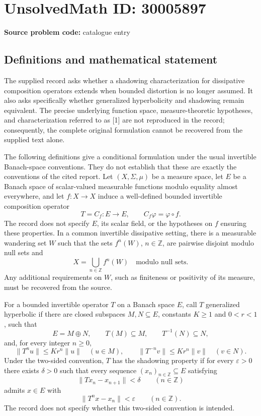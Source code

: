 \documentclass[11pt]{article}
\newcommand{\Z}{\mathbb{Z}}
\begin{document}
\section*{UnsolvedMath ID: 30005897}
\textbf{Source problem code:} catalogue entry
\subsection{Definitions and mathematical statement}
The supplied record asks whether a shadowing characterization for dissipative composition operators extends when bounded distortion is no longer assumed. It also asks specifically whether generalized hyperbolicity and shadowing remain equivalent. The precise underlying function space, measure-theoretic hypotheses, and characterization referred to as [1] are not reproduced in the record; consequently, the complete original formulation cannot be recovered from the supplied text alone.

The following definitions give a conditional formulation under the usual invertible Banach-space conventions. They do not establish that these are exactly the conventions of the cited report. Let \((X,\Sigma,\mu)\) be a measure space, let \(E\) be a Banach space of scalar-valued measurable functions modulo equality almost everywhere, and let \(f\colon X\to X\) induce a well-defined bounded invertible composition operator
\[
T=C_f\colon E\to E,\qquad C_f\varphi=\varphi\circ f.
\]
The record does not specify \(E\), its scalar field, or the hypotheses on \(f\) ensuring these properties. In a common invertible dissipative setting, there is a measurable wandering set \(W\) such that the sets \(f^n(W)\), \(n\in\Z\), are pairwise disjoint modulo null sets and
\[
X=\bigcup_{n\in\Z}f^n(W)\quad\text{modulo null sets}.
\]
Any additional requirements on \(W\), such as finiteness or positivity of its measure, must be recovered from the source.

For a bounded invertible operator \(T\) on a Banach space \(E\), call \(T\) generalized hyperbolic if there are closed subspaces \(M,N\subseteq E\), constants \(K\geq1\) and \(0<r<1\), such that
\[
E=M\oplus N,\qquad T(M)\subseteq M,\qquad T^{-1}(N)\subseteq N,
\]
and, for every integer \(n\geq0\),
\[
\|T^n u\|\leq Kr^n\|u\|\quad(u\in M),\qquad
\|T^{-n}v\|\leq Kr^n\|v\|\quad(v\in N).
\]
Under the two-sided convention, \(T\) has the shadowing property if for every \(\varepsilon>0\) there exists \(\delta>0\) such that every sequence \((x_n)_{n\in\Z}\subseteq E\) satisfying
\[
\|Tx_n-x_{n+1}\|<\delta\qquad(n\in\Z)
\]
admits \(x\in E\) with
\[
\|T^n x-x_n\|<\varepsilon\qquad(n\in\Z).
\]
The record does not specify whether this two-sided convention is intended.
\end{document}
